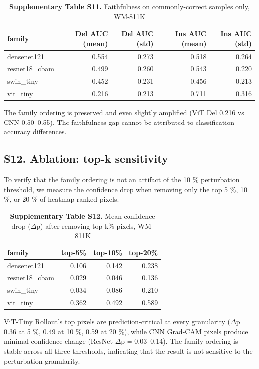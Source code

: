 \documentclass[11pt,a4paper]{article}
\begin{document}
\begin{table}[htbp]
\centering
\small
\caption{\textbf{Supplementary Table S11.} Faithfulness on commonly-correct samples only, WM-811K}
\begin{tabular}{lrrrr}
\toprule
family & Del AUC (mean) & Del AUC (std) & Ins AUC (mean) & Ins AUC (std) \\
\midrule
densenet121 & 0.554 & 0.273 & 0.518 & 0.264 \\
resnet18\_cbam & 0.499 & 0.260 & 0.543 & 0.220 \\
swin\_tiny & 0.452 & 0.231 & 0.456 & 0.213 \\
vit\_tiny & 0.216 & 0.213 & 0.711 & 0.316 \\
\bottomrule
\end{tabular}
\end{table}

The family ordering is preserved and even slightly amplified (ViT Del 0.216 vs CNN 0.50--0.55). The faithfulness gap cannot be attributed to classification-accuracy differences.

\subsection*{S12. Ablation: top-k sensitivity}

To verify that the family ordering is not an artifact of the 10 \% perturbation threshold, we measure the confidence drop when removing only the top 5 \%, 10 \%, or 20 \% of heatmap-ranked pixels.

\begin{table}[htbp]
\centering
\small
\caption{\textbf{Supplementary Table S12.} Mean confidence drop ($\Delta$p) after removing top-k\% pixels, WM-811K}
\begin{tabular}{lrrr}
\toprule
family & top-5\% & top-10\% & top-20\% \\
\midrule
densenet121 & 0.106 & 0.142 & 0.238 \\
resnet18\_cbam & 0.029 & 0.046 & 0.136 \\
swin\_tiny & 0.034 & 0.086 & 0.210 \\
vit\_tiny & 0.362 & 0.492 & 0.589 \\
\bottomrule
\end{tabular}
\end{table}

ViT-Tiny Rollout's top pixels are prediction-critical at every granularity ($\Delta$p = 0.36 at 5 \%, 0.49 at 10 \%, 0.59 at 20 \%), while CNN Grad-CAM pixels produce minimal confidence change (ResNet $\Delta$p = 0.03--0.14). The family ordering is stable across all three thresholds, indicating that the result is not sensitive to the perturbation granularity.
\end{document}

